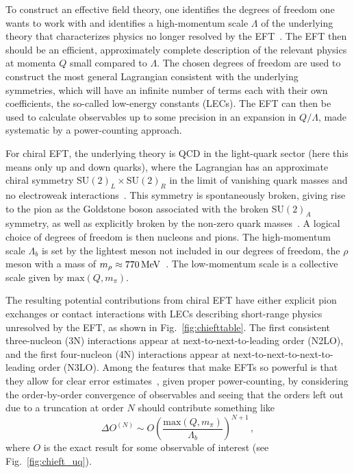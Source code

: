 To construct an effective field theory, one identifies the degrees of freedom one wants to work with
and identifies a high-momentum scale $\Lambda$ of the underlying theory that characterizes physics no longer resolved by the EFT~\cite{Hamm19nuceftreview}.
The EFT then should be an efficient, approximately complete description of the relevant physics
at momenta $Q$ small compared to $\Lambda$.
The chosen degrees of freedom are used to construct the most general Lagrangian consistent with the underlying symmetries,
which will have an infinite number of terms each with their own coefficients,
the so-called low-energy constants (LECs).
The EFT can then be used to calculate observables up to some precision in an expansion in $Q/\Lambda$,
made systematic by a power-counting approach.

For chiral EFT,
the underlying theory is QCD in the light-quark sector
(here this means only up and down quarks),
where the Lagrangian has an approximate chiral symmetry $\text{SU}{(2)}_L \times \text{SU}{(2)}_R$
in the limit of vanishing quark masses and no electroweak interactions~\cite{Hamm19nuceftreview}.
This symmetry is spontaneously broken,
giving rise to the pion as the Goldstone boson associated with the broken $\text{SU}{(2)}_A$ symmetry,
as well as explicitly broken by the non-zero quark masses~\cite{Page74chisymm}.
A logical choice of degrees of freedom is then nucleons and pions.
The high-momentum scale $\Lambda_b$ is set by the lightest meson not included in our degrees of freedom,
the $\rho$ meson with a mass of $m_{\rho}\approx 770 \, \text{MeV}$~\cite{Mach11chiraleft}.
The low-momentum scale is a collective scale given by $\text{max}(Q, m_{\pi})$.

The resulting potential contributions from chiral EFT have either explicit pion exchanges
or contact interactions with LECs describing short-range physics unresolved by the EFT,
as shown in Fig.~\ref{fig:chiefttable}.
The first consistent three-nucleon (3N) interactions appear at next-to-next-to-leading order (N2LO),
and the first four-nucleon (4N) interactions appear at next-to-next-to-next-to-leading order (N3LO).
Among the features that make EFTs so powerful is that they allow for clear error estimates~\cite{Furn15bayesuq,Epel14ekm1,Epel14ekm2},
given proper power-counting,
by considering the order-by-order convergence of observables
and seeing that the orders left out due to a truncation at order $N$ should contribute something like
\begin{equation}
  \Delta O^{(N)} \sim O {\left(\frac{\text{max}(Q, m_{\pi})}{\Lambda_b} \right)}^{N+1}\,,
\end{equation}
where $O$ is the exact result for some observable of interest
(see Fig.~\ref{fig:chieft_uq}).

